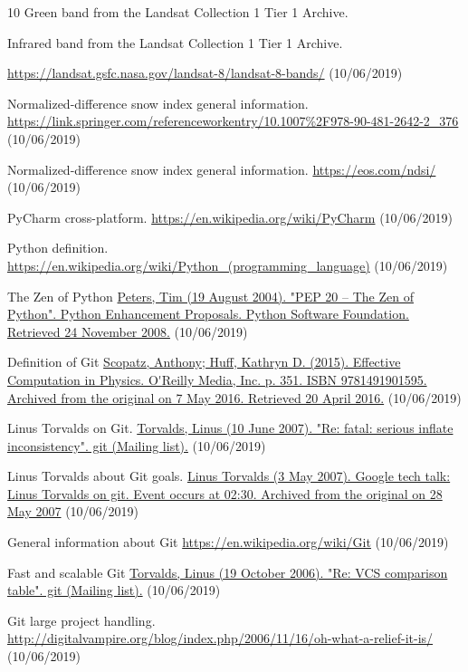 \documentclass[12pt, a4paper]{report}
\begin{document}
\begin{thebibliography} {10}
			Green band from the Landsat Collection 1 Tier 1 Archive.
			
			Infrared band from the Landsat Collection 1 Tier 1 Archive.
			
			\url{https://landsat.gsfc.nasa.gov/landsat-8/landsat-8-bands/}
			(10/06/2019)
			
			 Normalized-difference snow index general information.
			\url{https://link.springer.com/referenceworkentry/10.1007%2F978-90-481-2642-2_376}
				(10/06/2019)
				
				 Normalized-difference snow index general information.
				\url{https://eos.com/ndsi/}
				(10/06/2019)
				
				 PyCharm cross-platform.
				\url{https://en.wikipedia.org/wiki/PyCharm}
				(10/06/2019)
				
				 Python definition.
				\url{https://en.wikipedia.org/wiki/Python_(programming_language)}
				(10/06/2019)
				
				 The Zen of Python
				\url{Peters, Tim (19 August 2004). "PEP 20 – The Zen of Python". Python Enhancement Proposals. Python Software Foundation. Retrieved 24 November 2008.}
				(10/06/2019)
				
				 Definition of Git
				\url{Scopatz, Anthony; Huff, Kathryn D. (2015). Effective Computation in Physics. O'Reilly Media, Inc. p. 351. ISBN 9781491901595. Archived from the original on 7 May 2016. Retrieved 20 April 2016.}
				(10/06/2019)
				
				 Linus Torvalds on Git.
				\url{Torvalds, Linus (10 June 2007). "Re: fatal: serious inflate inconsistency". git (Mailing list).}
				(10/06/2019)
				
				 Linus Torvalds about Git goals.
				\url{Linus Torvalds (3 May 2007). Google tech talk: Linus Torvalds on git. Event occurs at 02:30. Archived from the original on 28 May 2007}
				(10/06/2019)
				
				 General information about Git
				\url{https://en.wikipedia.org/wiki/Git}
				(10/06/2019)
				
				 Fast and scalable Git
				\url{Torvalds, Linus (19 October 2006). "Re: VCS comparison table". git (Mailing list).}
				(10/06/2019)
				
				 Git large project handling.
				\url{http://digitalvampire.org/blog/index.php/2006/11/16/oh-what-a-relief-it-is/}
				(10/06/2019)
				

\end{thebibliography}
\end{document}
